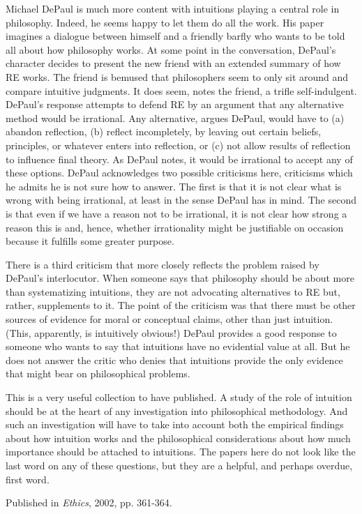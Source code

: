 \documentclass[
  11pt,
  letterpaper,
  DIV=11,
  numbers=noendperiod,
  twoside]{scrartcl}
\begin{document}
Michael DePaul is much more content with intuitions playing a central
role in philosophy. Indeed, he seems happy to let them do all the work.
His paper imagines a dialogue between himself and a friendly barfly who
wants to be told all about how philosophy works. At some point in the
conversation, DePaul's character decides to present the new friend with
an extended summary of how RE works. The friend is bemused that
philosophers seem to only sit around and compare intuitive judgments. It
does seem, notes the friend, a trifle self-indulgent. DePaul's response
attempts to defend RE by an argument that any alternative method would
be irrational. Any alternative, argues DePaul, would have to (a) abandon
reflection, (b) reflect incompletely, by leaving out certain beliefs,
principles, or whatever enters into reflection, or (c) not allow results
of reflection to influence final theory. As DePaul notes, it would be
irrational to accept any of these options. DePaul acknowledges two
possible criticisms here, criticisms which he admits he is not sure how
to answer. The first is that it is not clear what is wrong with being
irrational, at least in the sense DePaul has in mind. The second is that
even if we have a reason not to be irrational, it is not clear how
strong a reason this is and, hence, whether irrationality might be
justifiable on occasion because it fulfills some greater purpose.

There is a third criticism that more closely reflects the problem raised
by DePaul's interlocutor. When someone says that philosophy should be
about more than systematizing intuitions, they are not advocating
alternatives to RE but, rather, supplements to it. The point of the
criticism was that there must be other sources of evidence for moral or
conceptual claims, other than just intuition. (This, apparently, is
intuitively obvious!) DePaul provides a good response to someone who
wants to say that intuitions have no evidential value at all. But he
does not answer the critic who denies that intuitions provide the only
evidence that might bear on philosophical problems.

This is a very useful collection to have published. A study of the role
of intuition should be at the heart of any investigation into
philosophical methodology. And such an investigation will have to take
into account both the empirical findings about how intuition works and
the philosophical considerations about how much importance should be
attached to intuitions. The papers here do not look like the last word
on any of these questions, but they are a helpful, and perhaps overdue,
first word.



\noindent Published in\emph{
Ethics}, 2002, pp. 361-364.
\end{document}
